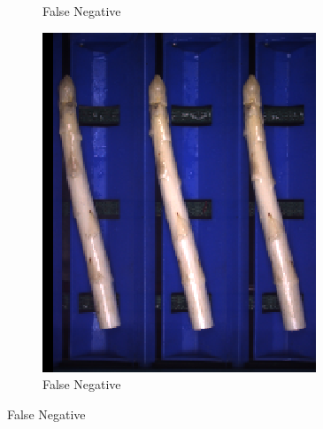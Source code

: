 \begin{figure}[h]
\begin{subfigure}{0.3\textwidth}
		\vspace{-5pt}
		\caption{False Negative}
	\end{subfigure}
	\begin{subfigure}{0.3\textwidth}
		\includegraphics[width=0.9\linewidth]{Figures/appendix/rustyhead_falsenegative_03.png}
		\vspace{-5pt}
		\caption{False Negative}
	\end{subfigure}


\end{figure}
